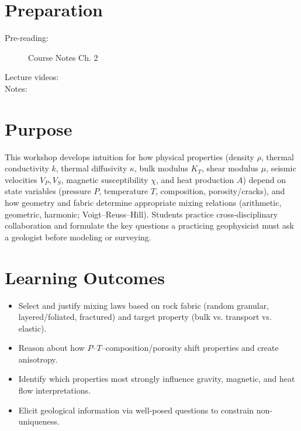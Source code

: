 
\workshopstart

\vspace{-0.75em}
\section*{Preparation}

\begin{description}
  \item[Pre-reading:] Course Notes Ch. 2
  \item[Lecture videos:]
  \item[Notes:]
\end{description}

\section*{Purpose}

This workshop develops intuition for how physical properties (density $\rho$, thermal conductivity $k$, thermal diffusivity $\kappa$, bulk modulus $K_T$, shear modulus $\mu$, seismic velocities $V_P, V_S$, magnetic susceptibility $\chi$, and heat production $A$) depend on state variables (pressure $P$, temperature $T$, composition, porosity/cracks), and how geometry and fabric determine appropriate mixing relations (arithmetic, geometric, harmonic; Voigt--Reuss--Hill). Students practice cross-disciplinary collaboration and formulate the key questions a practicing geophysicist must ask a geologist before modeling or surveying.

\section*{Learning Outcomes}
\begin{itemize}
  \item Select and justify mixing laws based on rock fabric (random granular, layered/foliated, fractured) and target property (bulk vs. transport vs. elastic).
  \item Reason about how $P$--$T$--composition/porosity shift properties and create anisotropy.
  \item Identify which properties most strongly influence gravity, magnetic, and heat flow interpretations.
  \item Elicit geological information via well-posed questions to constrain non-uniqueness.
\end{itemize}

